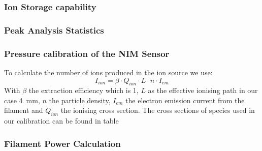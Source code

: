 		\subsubsection{Ion Storage capability}
		
	
		\subsubsection{Peak Analysis Statistics}
		
		\subsubsection{Pressure calibration of the NIM Sensor}
		
		To calculate the number of ions produced in the ion source we use:
		\begin{equation}
		I_{ion} = \beta\cdot Q_{ion}\cdot L\cdot n\cdot I_{em}
		\end{equation}
		With $\beta$ the extraction efficiency which is 1, %
		$L$ as the effective ionising path in our case 4~\si{\milli\metre}, $n$ the particle density, $I_{em}$ the electron emission current from the filament and $Q_{ion}$ the ionising cross section. The cross sections of species used in our calibration can be found in table %
		
		\subsubsection{Filament Power Calculation}
		
